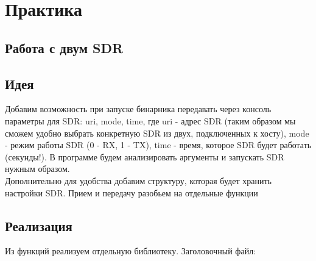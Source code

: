 \chapter{Практика}
\label{ch:intro}

\section{Работа с двум SDR}

\section{Идея}

Добавим возможность при запуске бинарника передавать через консоль параметры для SDR: uri, mode, time, где uri - адрес SDR 
(таким образом мы сможем удобно выбрать конкретную SDR из двух, подключенных к хосту), mode - режим работы SDR (0 - RX, 1 - TX), 
time - время, которое SDR будет работать (секунды!). В программе будем анализировать аргументы и запускать SDR нужным образом. \\

Дополнительно для удобства добавим структуру, которая будет хранить настройки SDR. Прием и передачу разобьем на отдельные функции

\section{Реализация}

Из функций реализуем отдельную библиотеку. Заголовочный файл:

